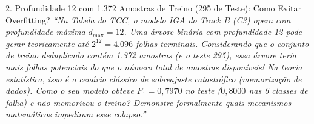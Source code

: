 \documentclass[11pt,a4paper]{article}
\begin{document}
\begin{boardQuestion}{2. Profundidade 12 com 1.372 Amostras de Treino (295 de Teste): Como Evitar Overfitting?}
\textit{“Na Tabela do TCC, o modelo IGA do Track B (C3) opera com profundidade máxima $d_{\max} = 12$. Uma árvore binária com profundidade 12 pode gerar teoricamente até $2^{12} = 4.096$ folhas terminais. Considerando que o conjunto de treino deduplicado contém 1.372 amostras (e o teste 295), essa árvore teria mais folhas potenciais do que o número total de amostras disponíveis! Na teoria estatística, isso é o cenário clássico de sobreajuste catastrófico (\textit{memorização de dados}). Como o seu modelo obteve $F_1 = 0{,}7970$ no teste ($0{,}8000$ nas 6 classes de falha) e não memorizou o treino? Demonstre formalmente quais mecanismos matemáticos impediram esse colapso.”}
\end{boardQuestion}
\end{document}
